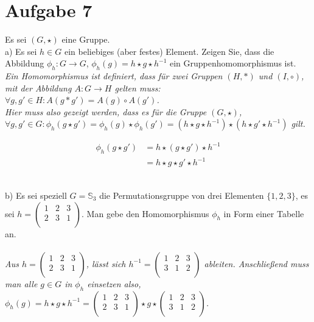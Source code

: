 \section*{Aufgabe 7}

Es sei $(G, \star)$ eine Gruppe.\\

a) Es sei $h \in G$ ein beliebiges (aber festes) Element. Zeigen Sie, dass die Abbildung $\phi_h : G \rightarrow G$, $\phi_h(g) = h \star g \star h^{-1}$ ein Gruppenhomomorphismus ist.\\

\textit{Ein Homomorphismus ist definiert, dass für zwei Gruppen $(H, *)$ und $(I, \circ)$, mit der Abbildung $A: G \rightarrow H$ gelten muss: $\forall g, g' \in H: A(g * g') = A(g) \circ A(g')$.}\\

\textit{Hier muss also gezeigt werden, dass es für die Gruppe $(G, \star)$, $\forall g, g' \in G: \phi_h(g \star g') = \phi_h(g) \star \phi_h(g') = (h \star g \star h^{-1}) \star (h \star g' \star h^{-1})$ gilt.}

\begin{align*}
\phi_h(g \star g') &= h \star (g \star g') \star h^{-1}\\
&= h \star g \star g' \star h^{-1}
\end{align*}\

b) Es sei speziell $G = \mathbb{S}_3$ die Permutationsgruppe von drei Elementen $\{1,2,3\}$, es sei $h = \begin{pmatrix}1 & 2 & 3\\2 & 3 & 1\\\end{pmatrix}$. Man gebe den Homomorphismus $\phi_h$ in Form einer Tabelle an.\\~\\

\textit{Aus $h = \begin{pmatrix}1 & 2 & 3\\2 & 3 & 1\\\end{pmatrix}$, lässt sich $h^{-1} = \begin{pmatrix}1 & 2 & 3\\3 & 1 & 2\\\end{pmatrix}$ ableiten. Anschließend muss man alle $g \in G$ in  $\phi_h$ einsetzen also, $\phi_h(g) = h \star g \star h^{-1} = \begin{pmatrix}1 & 2 & 3\\2 & 3 & 1\\\end{pmatrix} \star g \star \begin{pmatrix}1 & 2 & 3\\3 & 1 & 2\\\end{pmatrix}$.}\\~\\

